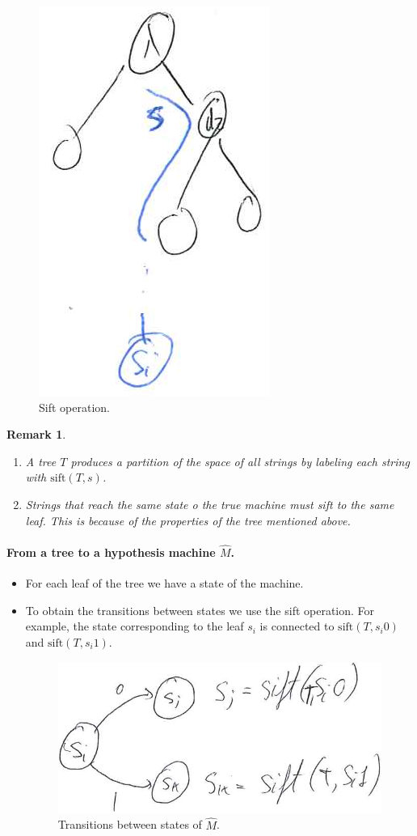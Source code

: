 \documentclass[12pt, letterpaper]{article}
\numberwithin{equation}{section} %
\newcommand{\mr}{\mathrm}
\newtheorem{remark}[theorem]{Remark}
\theoremstyle{definition}
\theoremstyle{remark}
\begin{document}
\begin{enumerate}
    \begin{figure}[H]
    \centering
    \includegraphics[width=0.1\linewidth]{../img/sift-tree.png}
    \caption{Sift operation.}
    \end{figure}
    \begin{remark}~
    \begin{enumerate}[-]
    \item A tree $T$ produces a partition of the space of all strings by labeling each string with $\mr{sift}(T,s)$.
    \item Strings that reach the same state o the true machine must sift to the same leaf. This is because of the properties of the tree mentioned above.
    \end{enumerate}
    \end{remark}
    
    \paragraph{From a tree to a hypothesis machine $\widehat M$.}
    \begin{itemize}
    \item For each leaf of the tree we have a state of the machine.
    \item To obtain the transitions between states we use the sift operation. For example, the state corresponding to the leaf $s_i$ is connected to $\mr{sift}(T, s_i0)$ and  $\mr{sift}(T, s_i1)$.
        \begin{figure}[H]
        \centering
        \includegraphics[width=0.2\linewidth]{../img/transitions.png}
        \caption{Transitions between states of $\widehat M$.}
        \end{figure}
    \end{itemize}
    

\end{enumerate}
\end{document}
